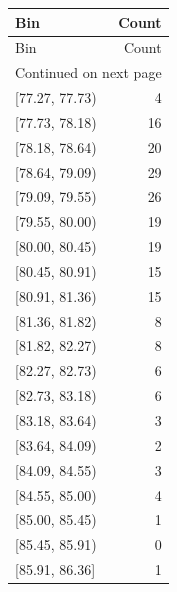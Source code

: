 \begin{longtable}{lr}
\toprule
Bin & Count \\
\midrule
\endfirsthead
\toprule
Bin & Count \\
\midrule
\endhead
\midrule
\multicolumn{2}{r}{Continued on next page} \\
\midrule
\endfoot
\bottomrule
\endlastfoot
{[77.27, 77.73)} & 4 \\
{[77.73, 78.18)} & 16 \\
{[78.18, 78.64)} & 20 \\
{[78.64, 79.09)} & 29 \\
{[79.09, 79.55)} & 26 \\
{[79.55, 80.00)} & 19 \\
{[80.00, 80.45)} & 19 \\
{[80.45, 80.91)} & 15 \\
{[80.91, 81.36)} & 15 \\
{[81.36, 81.82)} & 8 \\
{[81.82, 82.27)} & 8 \\
{[82.27, 82.73)} & 6 \\
{[82.73, 83.18)} & 6 \\
{[83.18, 83.64)} & 3 \\
{[83.64, 84.09)} & 2 \\
{[84.09, 84.55)} & 3 \\
{[84.55, 85.00)} & 4 \\
{[85.00, 85.45)} & 1 \\
{[85.45, 85.91)} & 0 \\
{[85.91, 86.36]} & 1 \\
\end{longtable}
